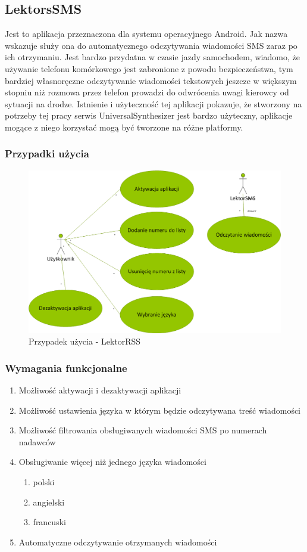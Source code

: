 \subsection{LektorsSMS}
Jest to aplikacja przeznaczona dla systemu operacyjnego Android. Jak nazwa wskazuje służy ona do automatycznego odczytywania wiadomości SMS zaraz po ich otrzymaniu. Jest bardzo przydatna w czasie jazdy samochodem, wiadomo, że używanie telefonu komórkowego jest zabronione z powodu bezpieczeństwa, tym bardziej własnoręczne odczytywanie wiadomości tekstowych jeszcze w większym stopniu niż rozmowa przez telefon prowadzi do odwrócenia uwagi kierowcy od sytuacji na drodze. Istnienie i użyteczność tej aplikacji pokazuje, że stworzony na potrzeby tej pracy serwis UniversalSynthesizer jest bardzo użyteczny, aplikacje mogące z niego korzystać mogą być tworzone na różne platformy.
\newpage
\subsubsection{Przypadki użycia}
\begin{figure}[!h]
	\centering
	\includegraphics[scale=0.45]{useCaseLektorSMS.png} 
	\caption{Przypadek użycia - LektorRSS}
\end{figure}

\subsubsection{Wymagania funkcjonalne}
\begin{enumerate}
	\item Możliwość aktywacji i dezaktywacji aplikacji
	\item Możliwość ustawienia języka w którym będzie odczytywana treść wiadomości
	\item Możliwość filtrowania obsługiwanych wiadomości SMS po numerach nadawców 
	\item Obsługiwanie więcej niż jednego języka wiadomości
		\begin{enumerate}
			\item polski
			\item angielski
			\item francuski
		\end{enumerate}
	\item Automatyczne odczytywanie otrzymanych wiadomości
\end{enumerate}

